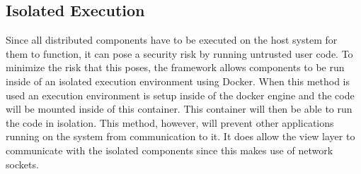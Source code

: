 \subsection{Isolated Execution}

Since all distributed components have to be executed on the host system for them to function, it can pose a security risk by running untrusted user code. To minimize the risk that this poses, the framework allows components to be run inside of an isolated execution environment using Docker. When this method is used an execution environment is setup inside of the docker engine and the code will be mounted inside of this container. This container will then be able to run the code in isolation. This method, however, will prevent other applications running on the system from communication to it. It does allow the view layer to communicate with the isolated components since this makes use of network sockets.

